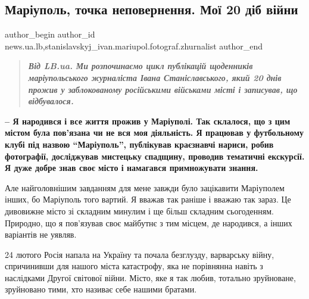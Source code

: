  
 
 
 
 
 
\subsection{Маріуполь, точка неповернення. Мої 20 діб війни}
\label{sec:31_03_2022.stz.news.ua.lb.1.moi_20_dib_vijny}
 
\ifcmt
 author_begin
   author_id news.ua.lb,stanislavskyj_ivan.mariupol.fotograf.zhurnalist
 author_end
\fi

\begin{quote}
\em\bfseries	
Від LB.ua. Ми розпочинаємо цикл публікацій щоденників маріупольського
журналіста Івана Станіславського, який 20 днів прожив у заблокованому
російськими військами місті і записував, що відбувалося. 
\end{quote}

\begingroup
\bfseries
– Я народився і все життя прожив у Маріуполі. Так склалося, що з цим містом
була пов'язана чи не вся моя діяльність. Я працював у футбольному клубі під
назвою \enquote{Маріуполь}, публікував краєзнавчі нариси, робив фотографії, досліджував
мистецьку спадщину, проводив тематичні екскурсії. Я дуже добре знав своє місто
і намагався примножувати знання.

Але найголовнішим завданням для мене завжди було зацікавити Маріуполем інших,
бо Маріуполь того вартий. Я вважав так раніше і вважаю так зараз. Це дивовижне
місто зі складним минулим і ще більш складним сьогоденням. Природно, що я
пов'язував своє майбутнє з тим місцем, де народився, а інших варіантів не
уявляв.

24 лютого Росія напала на Україну та почала безглузду, варварську війну,
спричинивши для нашого міста катастрофу, яка не порівнянна навіть з наслідками
Другої світової війни. Місто, яке я так любив, тотально зруйноване, зруйновано
тими, хто називає себе нашими братами.


